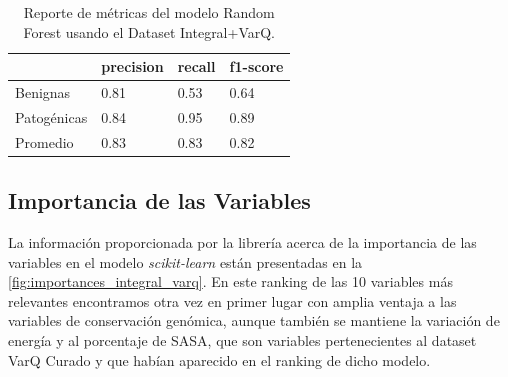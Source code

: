 \begin{table}[H]
\centering
\begin{tabular}{|l|l|l|l|}
\hline
             & precision & recall & f1-score \\ \hline
Benignas     & 0.81      & 0.53   & 0.64     \\ \hline
Patogénicas  & 0.84      & 0.95   & 0.89     \\ \hline
Promedio     & 0.83      & 0.83   & 0.82     \\ \hline
\end{tabular}
\caption{Reporte de métricas del modelo Random Forest usando el Dataset Integral+VarQ.}
\label{tab:metrics_integral_varq}
\end{table}

\subsection{Importancia de las Variables}
La información proporcionada por la librería acerca de la importancia de las variables en el modelo \textit{scikit-learn} están presentadas en la \ref{fig:importances_integral_varq}. En este ranking de las 10 variables más relevantes encontramos otra vez en primer lugar con amplia ventaja a las variables de conservación genómica, aunque también se mantiene la variación de energía y al porcentaje de SASA, que son variables pertenecientes al dataset VarQ Curado y que habían aparecido en el ranking de dicho modelo.



